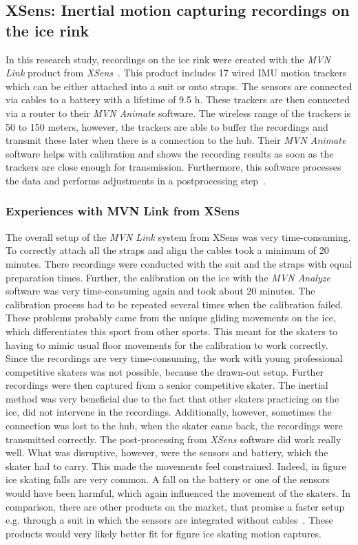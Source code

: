 \subsection{XSens: Inertial motion capturing recordings on the ice rink}
In this research study, recordings on the ice rink were created with the \textit{MVN Link} product from \textit{XSens}~\cite{xsensmvnanimate}.
This product includes 17 wired \gls{IMU} motion trackers which can be either attached into a suit or onto straps.
The sensors are connected via cables to a battery with a lifetime of 9.5 h.
These trackers are then connected via a router to their \textit{MVN Animate} software.
The wireless range of the trackers is 50 to 150 meters, however, the trackers are able to buffer the recordings
and transmit these later when there is a connection to the hub.
Their \textit{MVN Animate} software helps with calibration and shows the recording results as soon as the trackers are close
enough
for transmission.
Furthermore, this software processes the data and performs adjustments in a postprocessing step~\cite{xsensmvnanimate}.



\subsubsection*{Experiences with MVN Link from XSens}
The overall setup of the \textit{MVN Link} system from {XSens} was very time-consuming.
To correctly attach all the straps and align the cables took a
minimum of 20 minutes.
There recordings were conducted with the suit and the straps with equal preparation times.
Further, the calibration on the ice with the \textit{MVN Analyze} software was very time-consuming again and took about 20 minutes.
The calibration process had to be repeated several times when the calibration failed.
These problems probably came from the unique gliding movements on the ice, which differentiates this sport from other sports.
This meant for the skaters to having to mimic usual floor movements for the calibration to work correctly.
Since the recordings are very time-consuming, the work with young professional competitive skaters was not possible, because
the drawn-out setup.
Further recordings were then captured from a senior competitive skater.
The inertial method was very beneficial due to the fact that other
skaters practicing on the ice, did not intervene in the recordings.
Additionally, however, sometimes the connection was lost to
the hub, when the skater came back, the recordings were transmitted correctly.
The post-processing from \textit{XSens} software did work really well.
What was disruptive, however, were the sensors and battery, which the skater had to carry.
This made the movements feel constrained. Indeed, in figure ice skating falls are very common.
A fall on the battery or one of the sensors would have been harmful, which again influenced the movement of the
skaters.
In comparison, there are other products on the market, that promise a faster setup e.g. through a suit in which the
sensors
are integrated without cables~\cite{mocapinterialneuron}. These products would very likely better fit for figure ice
skating
motion captures.



